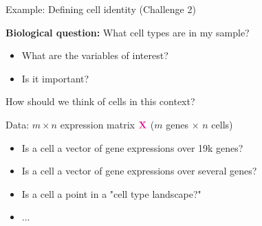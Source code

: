 \documentclass[
  12pt,
  ignorenonframetext,
  aspectratio=169]{beamer}
\begin{document}
\begin{frame}{Example: Defining cell identity (Challenge 2)}
\protect{}\label{example-defining-cell-identity-challenge-2}
\Large

\textbf{Biological question:} What cell types are in my sample?

\vfill

\begin{itemize}
\item
  What are the variables of interest?
\item
  Is it important?
\end{itemize}

\normalsize
\end{frame}

\begin{frame}{How should we think of cells in this context?}
\protect{}\label{how-should-we-think-of-cells-in-this-context}
\Large

Data: \(m\times{n}\) expression matrix \(\mathbf{\color{magenta} X}\)
(\(m\) genes \(\times\) \(n\) cells)

\vfill


\vfill

\begin{itemize}
\item<2> Is a cell a vector of gene expressions over 19k genes?
\item<2> Is a cell a vector of gene expressions over several genes?
\item<2> Is a cell a point in a "cell type landscape?"
\item<2> ...
\end{itemize}

\normalsize
\end{frame}
\end{document}
